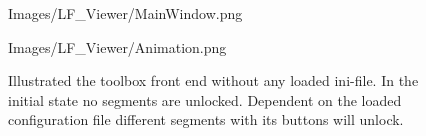 \begin{figure}[htb]
	\begin{minipage}[h]{0.48\textwidth}
		\centering
		\begin{overpic}[width=0.9\linewidth]{Images/LF_Viewer/MainWindow.png}
		\end{overpic}
	\end{minipage}
	\begin{minipage}[h]{0.48\textwidth}
		\centering
		\begin{overpic}[width=0.9\linewidth]{Images/LF_Viewer/Animation.png}
		\end{overpic}
	\end{minipage}
	\caption{Illustrated the toolbox front end without any loaded ini-file. In the initial state no segments are unlocked. Dependent on the loaded configuration file different segments with its buttons will unlock.}
	\label{figure_Window}
\end{figure}
